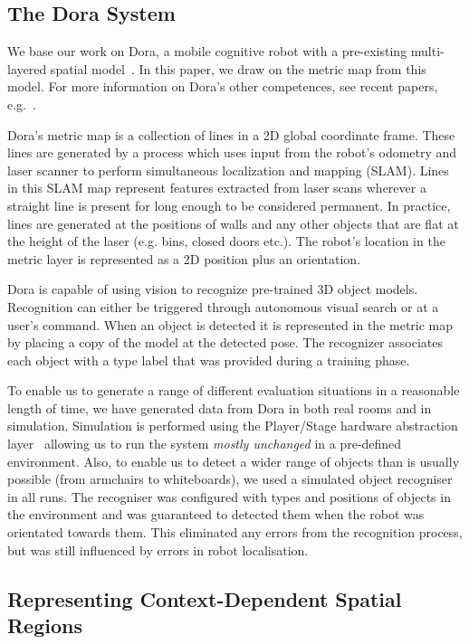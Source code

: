 \documentclass[letterpaper]{article}
\begin{document}
\subsection{The Dora System}

We base our work on Dora, a mobile cognitive robot with a pre-existing multi-layered spatial model~\cite{Hawes/etal:2011}. In this paper, we draw on the metric map from this model. For more information on Dora's other competences, see recent papers, e.g.~\cite{Hawes/etal:2011,Hanheide/etal:2011}.

Dora's metric map is a collection of lines in a 2D global coordinate frame. These lines are generated by a process which uses input from the robot's odometry and laser scanner to perform simultaneous localization and mapping (SLAM). Lines in this SLAM map represent features extracted from laser scans wherever a straight line is present for long enough to be considered permanent. In practice, lines are generated at the positions of walls and any other objects that are flat at the height of the laser (e.g. bins, closed doors etc.). The robot's location in the metric layer is represented as a 2D position plus an orientation. 

Dora is capable of using vision to recognize pre-trained 3D object models. Recognition can either be triggered through autonomous visual search or at a user's command. When an object is detected it is represented in the metric map 
by placing a copy of the model at the detected pose. The recognizer associates each object with a type label that was provided during a training phase.  

To enable us to generate a range of different evaluation situations in a reasonable length of time, we have generated data from Dora in both real rooms and in simulation. Simulation is performed using the Player/Stage hardware abstraction layer~\cite{GerkeyVaughanHoward03} allowing us to run the system \emph{mostly unchanged} in a pre-defined environment. Also, to enable us to detect a wider range of objects than is usually possible (from armchairs to whiteboards), we used a simulated object recogniser in all runs. The recogniser was configured with types and positions of objects in the environment and was guaranteed to detected them when the robot was orientated towards them. This eliminated any errors from the recognition process, but was still influenced by errors in robot localisation. 



\subsection{Representing Context-Dependent Spatial Regions}
\end{document}
